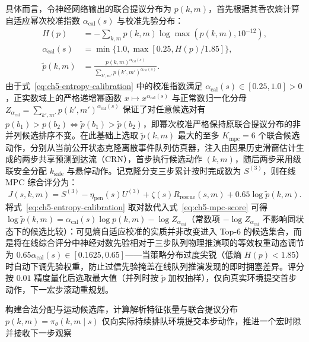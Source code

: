 具体而言，令神经网络输出的联合提议分布为 $p(k,m)$，首先根据其香农熵计算自适应幂次校准指数 $\alpha_{\mathrm{cal}}(s)$ 与校准先验分布：
\begin{equation}
 \begin{aligned}
 H(p)&=-\sum_{k,m}p(k,m)\log\max(p(k,m),10^{-12}),\\
 \alpha_{\mathrm{cal}}(s)&=\min\big\{1.0,\max[0.25,H(p)/1.85]\big\},\\
 \widetilde p(k,m)&=\frac{p(k,m)^{\alpha_{\mathrm{cal}}(s)}}{\sum_{k',m'}p(k',m')^{\alpha_{\mathrm{cal}}(s)}}.
 \end{aligned}
 \label{eq:ch5-entropy-calibration}
\end{equation}
由于式~\eqref{eq:ch5-entropy-calibration} 中的校准指数满足 $\alpha_{\mathrm{cal}}(s)\in[0.25,1.0]>0$，正实数域上的严格递增幂函数 $x\mapsto x^{\alpha_{\mathrm{cal}}(s)}$ 与正常数归一化分母 $Z_{\alpha_{\mathrm{cal}}}=\sum_{k',m'}p(k',m')^{\alpha_{\mathrm{cal}}(s)}$ 保证了对任意候选对有 $p(b_1)>p(b_2)\iff\widetilde{p}(b_1)>\widetilde{p}(b_2)$，即幂次校准严格保持原联合提议分布的非并列候选排序不变。在此基础上选取 $\widetilde p(k,m)$ 最大的至多 $K_{\mathrm{mpc}}=6$ 个联合候选动作，分别从当前公开状态克隆离散事件队列仿真器，注入由因果历史滑窗估计生成的两步共享预测到达流（CRN），首步执行候选动作 $(k,m)$，随后两步采用级联安全分配 $k_{\mathrm{safe}}$ 与悬停动作。记克隆分支三步累计按时完成数为 $S^{(3)}$，则在线 MPC 综合评分为：
\begin{equation}
 J(s,k,m)=S^{(3)}-\eta_{\mathrm{pen}}(s)U^{(3)}+\zeta(s)R_{\mathrm{rescue}}(s,m)
 +0.65\log\widetilde p(k,m).
 \label{eq:ch5-mpc-score}
\end{equation}
将式~\eqref{eq:ch5-entropy-calibration} 取对数代入式~\eqref{eq:ch5-mpc-score} 可得 $\log\widetilde{p}(k,m)=\alpha_{\mathrm{cal}}(s)\log p(k,m)-\log Z_{\alpha_{\mathrm{cal}}}$（常数项 $-\log Z_{\alpha_{\mathrm{cal}}}$ 不影响同状态下的候选比较）：可见熵自适应校准的实质并非改变进入 Top-6 的候选集合，而是将在线综合评分中神经对数先验相对于三步队列物理推演项的等效权重动态调节为 $0.65\alpha_{\mathrm{cal}}(s)\in[0.1625,0.65]$——当策略分布过度尖锐（低熵 $H(p)<1.85$）时自动下调先验权重，防止过信先验掩盖在线队列推演发现的即时拥塞差异。评分按 $0.01$ 精度量化后选取最大值（并列时按 $\widetilde{p}$ 加权抽样），仅向真实环境提交首步动作，下一宏步滚动重规划。

\begin{algorithm}[!htbp]
\caption{两种在线联合控制方式}
\label{alg:ch5-dynamic-control}
构建合法分配与运动候选库，计算解析特征张量与联合提议分布 $p(k,m)=\pi_\theta(k,m\mid s)$\;
仅向实际持续排队环境提交本步动作，推进一个宏时隙并接收下一步观察\;
\end{algorithm}

